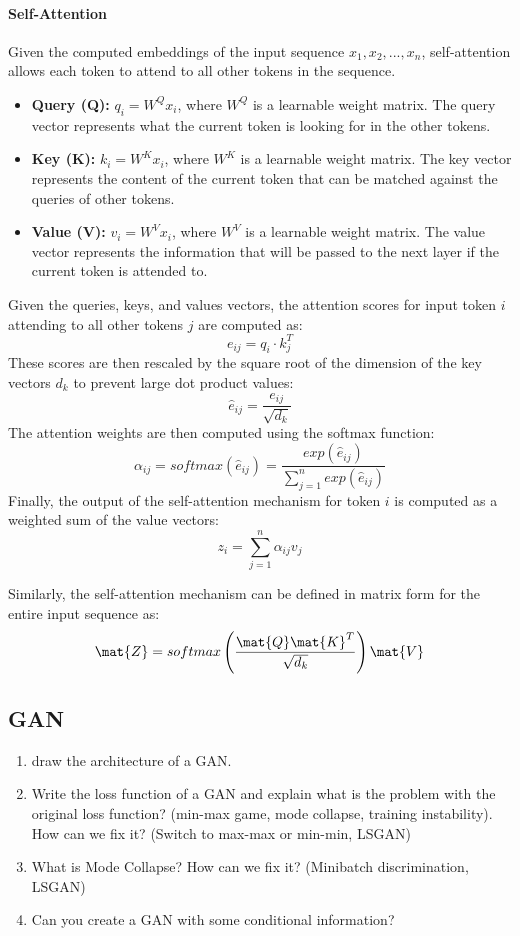 \paragraph{Self-Attention}
Given the computed embeddings of the input sequence $x_1, x_2, ..., x_n$, self-attention allows each token to attend to all other tokens in the sequence.
\begin{itemize}
    \item \textbf{Query (Q):} $q_i = W^Q x_i$, where $W^Q$ is a learnable weight matrix.
    The query vector represents what the current token is looking for in the other tokens.
    \item \textbf{Key (K):} $k_i = W^K x_i$, where $W^K$ is a learnable weight matrix.
    The key vector represents the content of the current token that can be matched against the queries of other tokens.
    \item \textbf{Value (V):} $v_i = W^V x_i$, where $W^V$ is a learnable weight matrix.
    The value vector represents the information that will be passed to the next layer if the current token is attended to.
\end{itemize}

Given the queries, keys, and values vectors, the attention scores for input token $i$ attending to all other tokens $j$ are computed as:
\[
e_{ij} = q_i \cdot k_j^T
\]
These scores are then rescaled by the square root of the dimension of the key vectors $d_k$ to prevent large dot product values:
\[
\hat{e}_{ij} = \frac{e_{ij}}{\sqrt{d_k}}
\]
The attention weights are then computed using the softmax function:
\[
\alpha_{ij} = softmax(\hat{e}_{ij}) = \frac{exp(\hat{e}_{ij})}{\sum_{j=1}^{n} exp(\hat{e}_{ij})}
\]
Finally, the output of the self-attention mechanism for token $i$ is computed as a weighted sum of the value vectors:
\[
z_i = \sum_{j=1}^{n} \alpha_{ij} v_j
\]

Similarly, the self-attention mechanism can be defined in matrix form for the entire input sequence as:
\[
\mat{Z} = softmax\left(\frac{\mat{Q} \mat{K}^T}{\sqrt{d_k}}\right) \mat{V}
\]

\subsection{GAN}
\begin{enumerate}
    \item draw the architecture of a GAN.
    \item Write the loss function of a GAN and explain what is the problem with the original loss function? (min-max game, mode collapse, training instability).
    How can we fix it? (Switch to max-max or min-min, LSGAN)
    \item What is Mode Collapse? How can we fix it? (Minibatch discrimination, LSGAN)
    \item Can you create a GAN with some conditional information? 
\end{enumerate}
